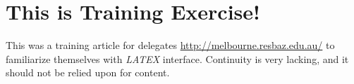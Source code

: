 \section{This is Training Exercise!}
This was a training article for delegates \href{Resbaz}{http://melbourne.resbaz.edu.au/} to familiarize themselves with \textit{LATEX} interface. 
Continuity is very lacking, and it should not be relied upon for content. 